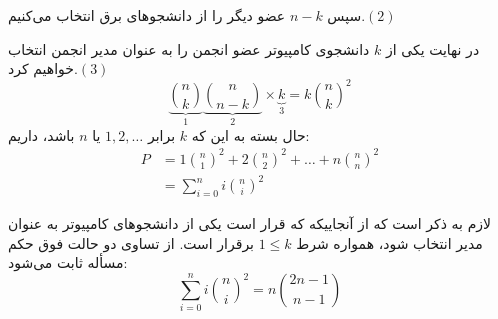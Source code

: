 \begin{enumerate}
        سپس
        $n-k$
        عضو دیگر را از دانشجو‌های برق انتخاب می‌کنیم.$(2)$
        
        در نهایت یکی از
        $k$
        دانشجوی کامپیوتر عضو انجمن را به عنوان مدیر انجمن انتخاب خواهیم کرد.$(3)$
        $$\underbrace{\binom{n}{k}}_1 \underbrace{\binom{n}{n-k}}_2\times \underbrace{k}_3 = k{\binom{n}{k}}^2$$
        حال بسته به این که
        $k$
        برابر 
        $1,2,\ldots$
        یا
        $n$
        باشد، داریم: 
        \begin{align*}
        P &= 1{\binom{n}{1}}^2 + 2{\binom{n}{2}}^2 + \ldots + n{\binom{n}{n}}^2\\
        &= \sum\limits_{i=0}^{n} i {\binom{n}{i}}^2
        \end{align*}
        
        لازم به ذکر است که از آنجاییکه که قرار است یکی از دانشجو‌های کامپیوتر به عنوان مدیر انتخاب شود، همواره شرط 
        $1\leq k$
        برقرار است.
        از تساوی دو حالت فوق حکم مسأله ثابت می‌شود:
        $$ \sum\limits_{i=0}^{n} i {\binom{n}{i}}^2 = n\binom{2n-1}{n-1}$$
    \end{enumerate}